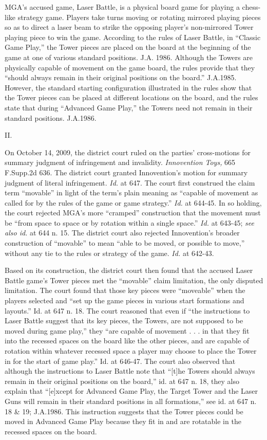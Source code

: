 MGA's accused game, Laser Battle, is a physical board game for playing a
chess-like strategy game. Players take turns moving or rotating mirrored
playing pieces so as to direct a laser beam to strike the opposing player's
non-mirrored Tower playing piece to win the game. According to the rules of
Laser Battle, in ``Classic Game Play,'' the Tower pieces are placed on the
board at the beginning of the game at one of various standard positions. J.A.
1986. Although the Towers are physically capable of movement on the game board,
the rules provide that they ``should always remain in their original positions
on the board.'' J.A.1985. However, the standard starting configuration
illustrated in the rules show that the Tower pieces can be placed at different
locations on the board, and the rules state that during ``Advanced Game Play,''
the Towers need not remain in their standard positions. J.A.1986.

{\centering
II.
\par}

On October 14, 2009, the district court ruled on the parties' cross-motions for
summary judgment of infringement and invalidity. \textit{Innovention Toys,} 665
F.Supp.2d 636. The district court granted Innovention's motion for summary
judgment of literal infringement. \textit{Id.} at 647. The court first
construed the claim term ``movable'' in light of the term's plain meaning as
``capable of movement as called for by the rules of the game or game
strategy.'' \textit{Id.} at 644-45. In so holding, the court rejected MGA's
more ``cramped'' construction that the movement must be ``from space to space
or by rotation within a single space.'' \textit{Id.} at 643-45; \textit{see
also id.} at 644 n. 15. The district court also rejected Innovention's broader
construction of ``movable'' to mean ``able to be moved, or possible to move,''
without any tie to the rules or strategy of the game. \textit{Id.} at 642-43.

Based on its construction, the district court then found that the accused Laser
Battle game's Tower pieces met the ``movable'' claim limitation, the only
disputed limitation. The court found that those key pieces were ``moveable''
when the players selected and ``set up the game pieces in various start
formations and layouts.'' Id. at 647 n. 18. The court reasoned that even if
``the instructions to Laser Battle suggest that its key pieces, the Towers, are
not supposed to be moved during game play,'' they ``are capable of movement . .
. in that they fit into the recessed spaces on the board like the other pieces,
and are capable of rotation within whatever recessed space a player may choose
to place the Tower in for the start of game play.'' Id. at 646-47. The court
also observed that although the instructions to Laser Battle note that ``[t]he
Towers should always remain in their original positions on the board,'' id. at
647 n. 18, they also explain that ``[e]xcept for Advanced Game Play, the Target
Tower and the Laser Guns will remain in their standard positions in all
formations,'' see id. at 647 n. 18 \& 19; J.A.1986. This instruction suggests
that the Tower pieces could be moved in Advanced Game Play because they fit in
and are rotatable in the recessed spaces on the board.

